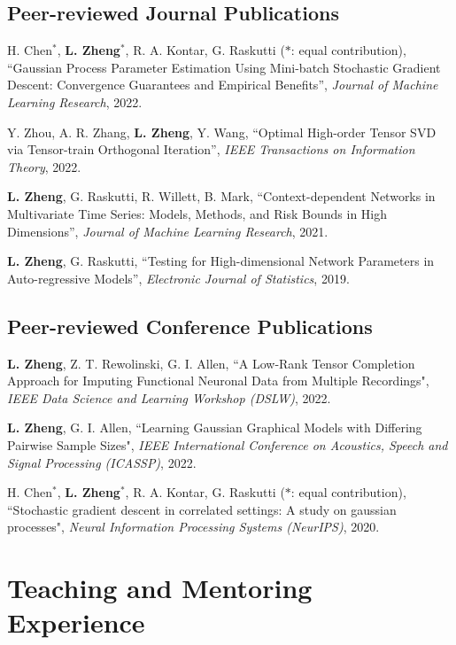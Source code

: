\documentclass[letterpaper,11pt]{article}
\begin{document}
	\subsection*{Peer-reviewed Journal Publications}
	\begin{etaremune}[start=7]
		\item H. Chen$^{*}$, {\bf L. Zheng}$^{*}$, R. A. Kontar, G. Raskutti ($*$: equal contribution), ``Gaussian Process Parameter Estimation Using Mini-batch Stochastic Gradient Descent: Convergence Guarantees and Empirical Benefits'', {\em Journal of Machine Learning Research}, 2022.
		\item Y. Zhou, A. R. Zhang, {\bf L. Zheng}, Y. Wang, ``Optimal High-order Tensor SVD via Tensor-train Orthogonal
		Iteration'', {\em  IEEE Transactions on Information Theory}, 2022.
		\item {\bf L. Zheng}, G. Raskutti, R. Willett, B. Mark, ``Context-dependent Networks in Multivariate Time Series: Models, Methods, and Risk Bounds in High Dimensions'', {\em Journal of Machine Learning Research}, 2021.
		\item {\bf L. Zheng}, G. Raskutti, ``Testing for High-dimensional Network Parameters in Auto-regressive Models'', {\em Electronic Journal of Statistics}, 2019.
	\end{etaremune}
	\subsection*{Peer-reviewed Conference Publications}
\begin{etaremune}[start=3]
	\item {\bf L. Zheng}, Z. T. Rewolinski, G. I. Allen, ``A Low-Rank Tensor Completion Approach for Imputing Functional Neuronal Data from Multiple Recordings", {\em IEEE Data Science and Learning Workshop (DSLW)}, 2022.
	\item {\bf L. Zheng}, G. I. Allen, ``Learning Gaussian Graphical Models with Differing Pairwise Sample Sizes", {\em IEEE International Conference on Acoustics, Speech and Signal Processing (ICASSP)}, 2022.
	\item  H. Chen$^{*}$, {\bf L. Zheng}$^{*}$, R. A. Kontar, G. Raskutti ($*$: equal contribution), ``Stochastic gradient descent in correlated settings: A study on gaussian processes", {\em Neural Information Processing Systems (NeurIPS)}, 2020.
\end{etaremune}

	\section{Teaching and Mentoring Experience}
\end{document}

